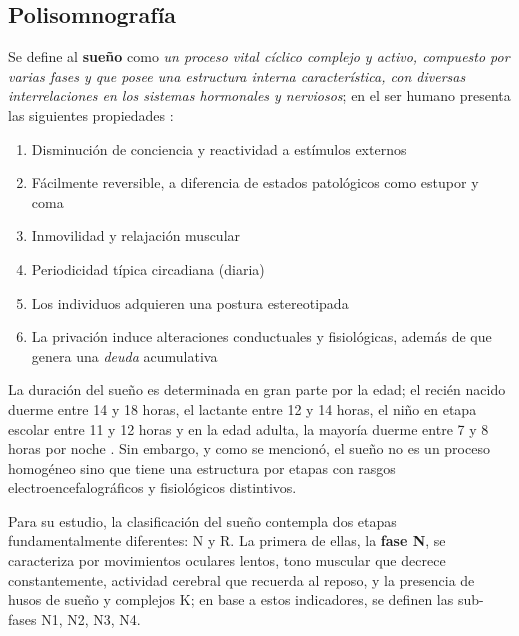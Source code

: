 \subsection{Polisomnografía}

Se define al \textbf{sueño} como \textit{un proceso vital cíclico complejo y activo, compuesto por 
varias fases y que posee una estructura interna característica, con diversas interrelaciones en los 
sistemas hormonales y nerviosos};
en el ser humano presenta las siguientes propiedades \cite{CarrilloMora}:
\begin{enumerate}
\item Disminución de conciencia y reactividad a estímulos externos
\item Fácilmente reversible, a diferencia de estados patológicos como estupor y coma
\item Inmovilidad y relajación muscular
\item Periodicidad típica circadiana (diaria)
\item Los individuos adquieren una postura estereotipada
\item La privación induce alteraciones conductuales y 
fisiológicas, además de que genera una \textit{deuda} acumulativa
\end{enumerate}

La duración del sueño es determinada en gran parte por la edad; el recién nacido duerme entre 14 y 
18 horas, el lactante entre 12 y 14 horas, el niño en etapa escolar entre 11 y 12 horas y en la 
edad adulta, la mayoría duerme entre 7 y 8 horas por noche \cite{Contreras13}.
Sin embargo, y como se mencionó, el sueño no es un proceso homogéneo sino que tiene una estructura 
por etapas con rasgos electroencefalográficos y fisiológicos distintivos.

Para su estudio, la clasificación del sueño 
contempla dos etapas fundamentalmente diferentes: N y R.
La primera de ellas, la \textbf{fase N}, se caracteriza por movimientos oculares lentos, tono 
muscular que decrece constantemente, actividad cerebral que recuerda al reposo, y la presencia de
husos de sueño y complejos K; en base a estos indicadores, se definen las sub-fases N1, N2, N3, N4.
%

